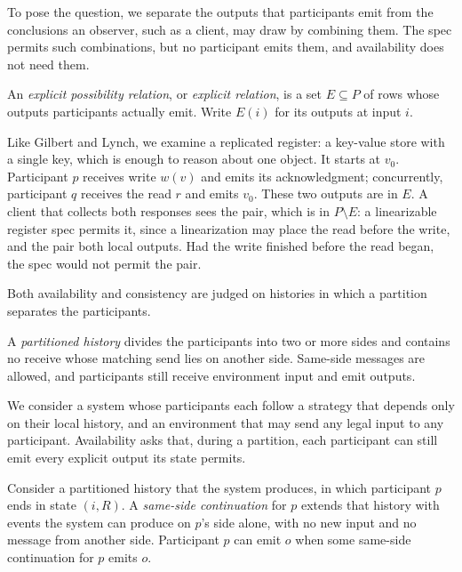 To pose the question, we separate the outputs that participants emit from
the conclusions an observer, such as a client, may draw by combining them.  The spec permits such combinations, but no participant emits them, and
availability does not need them.

\begin{definition}
\label{def:explicit-relation}
An \emph{explicit possibility relation}, or \emph{explicit relation}, is a set
$E\subseteq P$ of rows whose outputs participants actually emit.  Write $E(i)$
for its outputs at input $i$.
\end{definition}

Like Gilbert and Lynch, we examine a replicated register: a key-value store
with a single key, which is enough to reason about one object.  It starts at
$v_0$.  Participant $p$ receives write $w(v)$ and emits its acknowledgment;
concurrently, participant $q$ receives the read $r$ and emits $v_0$.  These two
outputs are in $E$.  A client that collects both responses sees the pair,
which is in $P\setminus E$: a linearizable register spec permits it, since a
linearization may place the read before the write, and the pair \outrel both local outputs.  Had the write finished before the read began, the
spec would not permit the pair.

Both availability and consistency are judged on histories in which a partition
separates the participants.

\begin{definition}
\label{def:partitioned-history}
A \emph{partitioned history} divides the participants into two or more
sides and contains no receive whose matching send lies on another
side.  Same-side messages are allowed, and participants still receive environment input
and emit outputs.
\end{definition}

We consider a system whose participants each follow a strategy that depends
only on their local history, and an environment that may send any legal input
to any participant.  Availability asks that, during a partition, each
participant can still emit every explicit output its state permits.

\begin{definition}
\label{def:local-continuation}
Consider a partitioned history that the system produces, in which participant
$p$ ends in state $(i,R)$.  A \emph{same-side continuation} for $p$ extends that
history with events the system can produce on $p$'s side alone, with no new
input and no message from another side.  Participant $p$ can emit $o$ when some same-side continuation for $p$ emits
$o$.
\end{definition}

